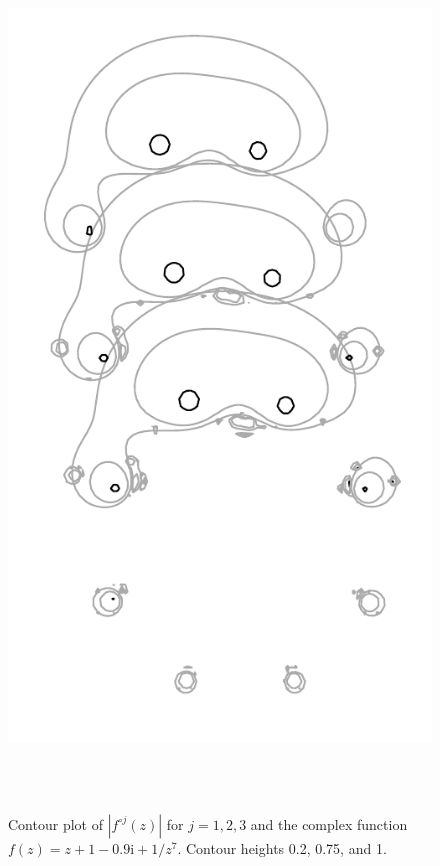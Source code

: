 \documentclass[12pt, a4paper]{amsart}
\newcommand{\mi}{\text{i}}  %
\begin{document}
\pagebreak
\begin{figure}[!ht]
\includegraphics[height=230mm]{three_monkeys.pdf}
\caption{
Contour plot of $|f^{\circ j}(z)|$ for $j = 1, 2, 3$ and the complex function $f(z) = z + 1 -0.9\mi + 1/z^7$.
Contour heights 0.2, 0.75, and 1.
}
\end{figure}
\pagebreak
\end{document}
